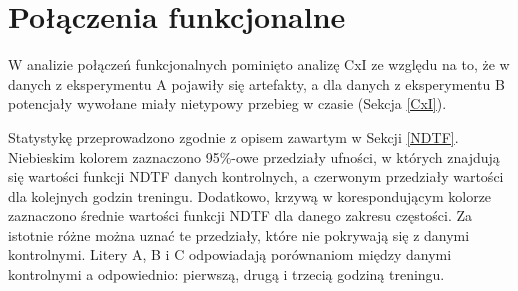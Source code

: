 \documentclass{pracamgr_2}
\begin{document}
	\section{Połączenia funkcjonalne}
	W analizie połączeń funkcjonalnych pominięto analizę CxI ze względu na to, że w danych z eksperymentu A pojawiły się artefakty, a dla danych z eksperymentu B potencjały wywołane miały nietypowy przebieg w czasie (Sekcja \ref{CxI}).
	
	Statystykę przeprowadzono zgodnie z opisem zawartym w Sekcji \ref{NDTF}. Niebieskim kolorem zaznaczono 95\%-owe przedziały ufności, w których znajdują się wartości funkcji NDTF danych kontrolnych, a czerwonym przedziały wartości dla kolejnych godzin treningu. Dodatkowo, krzywą w korespondującym kolorze zaznaczono średnie wartości funkcji NDTF dla danego zakresu częstości.	
	Za istotnie różne można uznać te przedziały, które nie pokrywają się z danymi kontrolnymi. Litery A, B i C odpowiadają porównaniom między danymi kontrolnymi a odpowiednio: pierwszą, drugą i trzecią godziną treningu.
	
\end{document}
